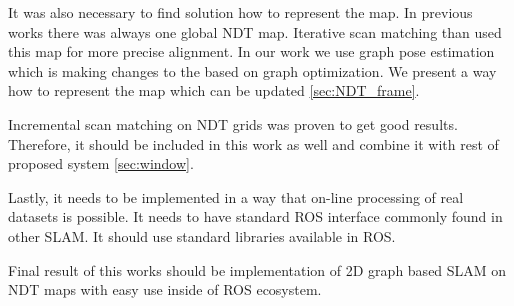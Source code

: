 It was also necessary to find solution how to represent the map. In previous works there was always one global \gls{NDT} map. Iterative scan matching than used this map for more precise alignment. In our work we use graph pose estimation which is making changes to the based on graph optimization. We present a way how to represent the map which can be updated \ref{sec:NDT_frame}.

Incremental scan matching on \gls{NDT} grids was proven to get good results. Therefore, it should be included in this work as well and combine it with rest of proposed system \ref{sec:window}.   

Lastly, it needs to be implemented in a way that on-line processing of real datasets is possible. It needs to have standard \gls{ROS} interface commonly found in other \gls{SLAM}. It should use standard libraries available in \gls{ROS}.

Final result of this works should be implementation of 2D graph based \gls{SLAM} on \gls{NDT} maps with easy use inside of \gls{ROS} ecosystem. 